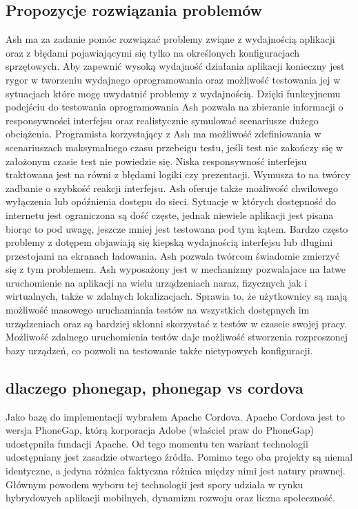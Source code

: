 \documentclass[a4paper]{article}
\begin{document}
\subsection{Propozycje rozwiązania problemów}
Ash ma za zadanie pomóc rozwiązać problemy zwiąne z wydajnością aplikacji oraz z
błędami pojawiającymi się tylko na określonych konfiguracjach sprzętowych. Aby
zapewnić wysoką wydajność działania aplikacji konieczny jest rygor w tworzeniu
wydajnego oprogramowania oraz możliwość testowania jej w sytuacjach które mogę
uwydatnić problemy z wydajnością. Dzięki funkcyjnemu podejściu do testowania
oprogramowania Ash pozwala na zbieranie informacji o responsywności interfejsu
oraz realistycznie symulować scenariusze dużego obciążenia. Programista
korzystający z Ash ma możliwość zdefiniowania w scenariuszach maksymalnego
czasu przebeigu testu, jeśli test nie zakończy się w założonym czasie test nie
powiedzie się. Niska responsywność interfejsu traktowana jest na równi z błędami
logiki czy prezentacji. Wymusza to na twórcy zadbanie o szybkość reakcji interfejsu.
Ash oferuje także możliwość chwilowego wyłączenia lub opóźnienia dostępu do
sieci. Sytuacje w których dostępność do internetu jest ograniczona są dość częste,
jednak niewiele aplikacji jest pisana biorąc to pod uwagę, jeszcze mniej jest
testowana pod tym kątem. Bardzo często problemy z dotępem objawiają się kiepską
wydajnością interfejsu lub długimi przestojami na ekranach ładowania. Ash pozwala
twórcom świadomie zmierzyć się z tym problemem. Ash wyposażony jest w
mechanizmy pozwalajace na łatwe uruchomienie na aplikacji na wielu urządzeniach
naraz, fizycznych jak i wirtualnych, także w zdalnych lokalizacjach. Sprawia to, że
użytkownicy są mają możliwość masowego uruchamiania testów na wszystkich
dostępnych im urządzeniach oraz są bardziej skłonni skorzystać z testów w czaseie
swojej pracy. Możliwość zdalnego uruchomienia testów daje możliwość stworzenia
rozproszonej bazy urządzeń, co pozwoli na testowanie także nietypowych
konfiguracji.

\subsection{dlaczego phonegap, phonegap vs cordova}
Jako bazę do implementacji wybrałem Apache Cordova. Apache Cordova jest to
wersja PhoneGap, którą korporacja Adobe (właściel praw do PhoneGap) udostępniła
fundacji Apache. Od tego momentu ten wariant technologii udostępniany jest
zasadzie otwartego źródła. Pomimo tego oba projekty są niemal identyczne, a jedyna
różnica faktyczna różnica między nimi jest natury prawnej. Głównym powodem
wyboru tej technologii jest spory udziała w rynku hybrydowych aplikacji mobilnych,
dynamizm rozwoju oraz liczna społeczność.
\end{document}
